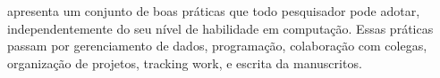  apresenta um conjunto de boas práticas que todo
pesquisador pode adotar, independentemente do seu nível de habilidade em
computação. Essas práticas passam por gerenciamento de dados, programação,
colaboração com colegas, organização de projetos, tracking work, e escrita da
manuscritos.


